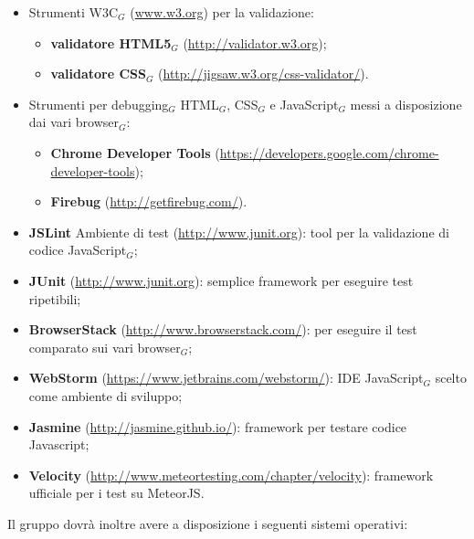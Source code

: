 \begin{itemize}
	\item Strumenti W3C$_G$ (\href{www.w3.org}{www.w3.org}) per la validazione:
	    \begin{itemize}
	    	\item \textbf{validatore HTML5$_G$} (\href{http://validator.w3.org}{http://validator.w3.org});
	    	\item \textbf{validatore CSS$_G$}
	    	(\href{http://jigsaw.w3.org/css-validator/}{http://jigsaw.w3.org/css-validator/}).
	    \end{itemize}
	
	\item Strumenti per debugging$_G$ HTML$_G$, CSS$_G$ e JavaScript$_G$ messi a disposizione dai vari browser$_G$:
	    \begin{itemize}
	    	\item \textbf{Chrome Developer Tools} (\href{https://developers.google.com/chrome-developer-tools}
	    	{https://developers.google.com/chrome-developer-tools});
	    	\item \textbf{Firebug}
	    	(\href{http://getfirebug.com/}{http://getfirebug.com/}).
	    \end{itemize}
	\item \textbf{JSLint} Ambiente di test (\href{http://www.junit.org}{http://www.junit.org}): tool per la validazione di codice JavaScript$_G$;
	\item \textbf{JUnit} (\href{http://www.junit.org}{http://www.junit.org}): semplice framework per eseguire test ripetibili;
	\item \textbf{BrowserStack} (\href{http://www.browserstack.com/}{http://www.browserstack.com/}):  per eseguire il test comparato sui vari browser$_G$;
	\item \textbf{WebStorm} (\href{https://www.jetbrains.com/webstorm/}{https://www.jetbrains.com/webstorm/}): IDE JavaScript$_G$ scelto come ambiente di sviluppo;
	\item \textbf{Jasmine} (\href{http://jasmine.github.io/}{http://jasmine.github.io/}): framework per testare codice Javascript;
	\item \textbf{Velocity} (\href{http://www.meteortesting.com/chapter/velocity}{http://www.meteortesting.com/chapter/velocity}): framework ufficiale per i test su MeteorJS.
\end{itemize}
Il gruppo dovrà inoltre avere a disposizione i seguenti sistemi operativi:

